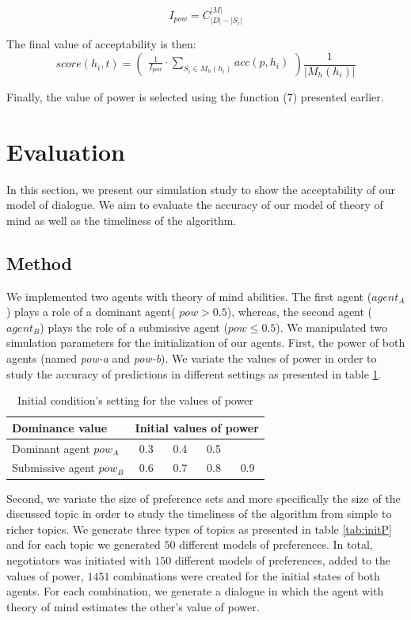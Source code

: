 \documentclass[sigconf]{aamas}  %
\begin{document}
	$$I_{pow} =  C_{|D|-|S_i|}^{|M|}$$
	
	
	The final value of acceptability is then:
	\begin{equation}
	score(h_i, t)= \left( \begin{array}{c}  \frac{1}{I_{pow}} \cdot \sum_{S_i \in M_h(h_i) } acc(p, h_i) 
	\end{array}\right) \frac{1}{| M_h(h_i)|}
	\end{equation}
	
	Finally, the value of power is selected using the function (7) presented earlier.
	
	
	\section{Evaluation}
	In this section, we present our simulation study to show the acceptability of our model of dialogue. We aim to evaluate the accuracy of our model of theory of mind as well as the timeliness of the algorithm.
	
	\subsection{Method}
	
	We implemented two agents with theory of mind abilities.
	The first agent ($agent_A$) plays a role of a dominant agent( $pow > 0.5$), whereas, the second agent ($agent_B$) plays the role of a submissive agent ($pow \leq 0.5$). 
	We manipulated two simulation parameters for the initialization of our agents. First, the power of both agents (named \emph{pow-a} and \emph{pow-b}). We variate the values of power in order to study the accuracy of predictions in different settings as presented in table \ref{tab:powsettings}.
		\begin{table}[t]
			\centering
			\begin{tabular}{|l|cccc|}
				\hline 
				\textbf{Dominance value } &	\multicolumn{4}{c|}{ Initial values of power } \\
				\hline
				Dominant agent $pow_A$ & 0.3 & 0.4 & 0.5 &  \\
				\hline
				Submissive agent $pow_B$ & 0.6 & 0.7 & 0.8 & 0.9\\
				\hline
			\end{tabular}
			\caption{Initial condition's setting for the values of power} 
			\label{tab:powsettings}
		\end{table}
		
	Second, we variate the size of preference sets and more specifically the size of the discussed topic in order to study the timeliness of the algorithm from simple to richer topics. We generate three types of topics as presented in table \ref{tab:initP} and for each topic we generated $50$ different models of preferences. In total, negotiators was initiated with $150$ different models of preferences, added to the values of power,  $1451$ combinations were created for the initial states of both agents. For each combination, we generate a dialogue in which the agent with theory of mind estimates the other's value of power.
\end{document}
